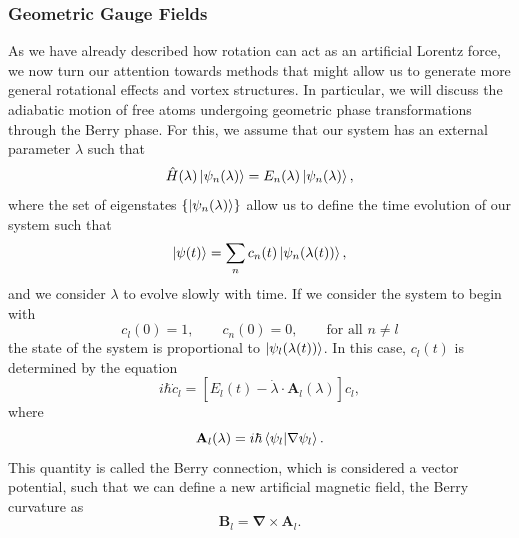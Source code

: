 \subsubsection{Geometric Gauge Fields}
\label{sec:geom}

As we have already described how rotation can act as an artificial Lorentz force, we now turn our attention towards methods that might allow us to generate more general rotational effects and vortex structures.
In particular, we will discuss the adiabatic motion of free atoms undergoing geometric phase transformations through the Berry phase. 
For this, we assume that our system has an external parameter $\lambda$ such that
\begin{equation}
\hat H(\lambda) \ket{\psi_n(\lambda)} = E_n(\lambda)\ket{\psi_n(\lambda)},
\end{equation}
where the set of eigenstates $\left\{ \ket{\psi_n(\lambda)} \right\}$ allow us to define the time evolution of our system such that
\begin{equation}
\ket{\psi(t)} = \sum_n c_n(t) \ket{\psi_n(\lambda(t))},
\end{equation}
and we consider $\lambda$ to evolve slowly with time. If we consider the system to begin with
\begin{equation}
c_l(0) = 1,
\qquad
c_n(0) = 0, 
\qquad
\text{for all } n\neq l
\end{equation}
the state of the system is proportional to $\ket{\psi_l(\lambda(t))}$.
In this case, $c_l(t)$ is determined by the equation
\begin{equation}
i \hbar \dot{c}_l =  [E_l(t) - \dot{\lambda} \cdot \mathbf{A}_l(\lambda)]c_l,
\label{Bcnx-1}
\end{equation}
where 
\begin{equation}
\mathbf{A}_l(\lambda) = i \hbar \braket{\psi_l|\nabla\psi_l}.
\label{eqn:Bcnx}
\end{equation}
This quantity is called the Berry connection, which is considered a vector potential, such that we can define a new artificial magnetic field, the Berry curvature as
\begin{equation}
\mathbf{B}_l = \mathbf{\nabla} \times \mathbf{A}_l.
\label{eqn:BC}
\end{equation}

